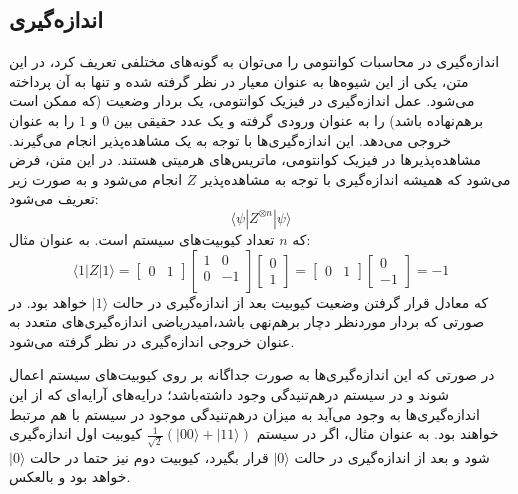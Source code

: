 \subsection{اندازه‌گیری}
اندازه‌گیری در محاسبات کوانتومی را می‌توان به گونه‌های مختلفی تعریف کرد، در این متن، یکی از این شیوه‌ها به عنوان معیار در نظر گرفته شده و تنها به آن پرداخته می‌شود.
عمل اندازه‌گیری در فیزیک کوانتومی، یک بردار وضعیت (که ممکن است برهم‌نهاده باشد) را به عنوان ورودی گرفته و یک عدد حقیقی بین
$0$
و
$1$
را به عنوان خروجی می‌دهد.
این اندازه‌گیری‌ها با توجه به یک مشاهده‌پذیر  انجام می‌گیرند. مشاهده‌پذیرها در فیزیک کوانتومی، ماتریس‌های هرمیتی هستند. در این متن، فرض می‌شود که همیشه اندازه‌گیری با توجه به مشاهده‌پذیر 
$Z$
انجام می‌شود و به صورت زیر تعریف می‌شود:
\begin{equation}
    \langle \psi| Z^{\otimes n} | \psi\rangle
\end{equation}
\hsm
که
$n$
تعداد کیوبیت‌های سیستم است. به عنوان مثال:
\begin{equation}
    \langle 1 | Z | 1 \rangle = 
    \begin{bmatrix}
    0 & 1
    \end{bmatrix} 
    \begin{bmatrix}
    1 & 0 \\[3pt]
    0 & -1 \\[3pt]
    \end{bmatrix}
    \begin{bmatrix}
    0 \\[3pt] 1
    \end{bmatrix} 
    = \begin{bmatrix}
    0 & 1
    \end{bmatrix} 
    \begin{bmatrix}
    0 \\[3pt] -1
    \end{bmatrix}
    = -1
\end{equation}
\hsm
که معادل قرار گرفتن وضعیت کیوبیت بعد از اندازه‌گیری در حالت 
$|1\rangle$
خواهد بود. در صورتی که بردار موردنظر دچار برهم‌نهی باشد،امیدریاضی اندازه‌گیری‌های متعدد به عنوان خروجی اندازه‌گیری در نظر گرفته می‌شود.

در صورتی که این اندازه‌گیری‌ها به صورت جداگانه بر روی کیوبیت‌های سیستم اعمال شوند و در سیستم در‌هم‌تنیدگی وجود داشته‌باشد؛ درایه‌های آرایه‌ای که از این اندازه‌گیری‌ها به وجود می‌آید به میزان درهم‌تنیدگی موجود در سیستم با هم مرتبط خواهند بود. به عنوان مثال، اگر در سیستم
$\frac{1}{\sqrt{2}} (|00\rangle + |11\rangle)$
کیوبیت اول اندازه‌گیری شود و بعد از اندازه‌گیری در حالت 
$|0\rangle$
قرار بگیرد، کیوبیت دوم نیز حتما در حالت
$|0\rangle$
خواهد بود و بالعکس.

